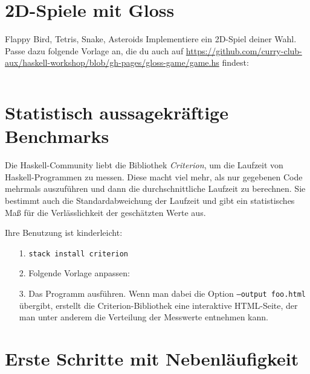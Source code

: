 \documentclass{uebblatt}
\begin{document}
\section{2D-Spiele mit Gloss}

\begin{aufgabe}{Flappy Bird, Tetris, Snake, Asteroids}
  Implementiere ein 2D-Spiel deiner Wahl.
  Passe dazu folgende Vorlage an, die du auch auf \url{https://github.com/curry-club-aux/haskell-workshop/blob/gh-pages/gloss-game/game.hs} findest:

\inputminted[fontsize=\scriptsize]{haskell}{gloss-game/game.hs}
\end{aufgabe}

\section{Statistisch aussagekräftige Benchmarks}

Die Haskell-Community liebt die Bibliothek \emph{Criterion}, um die Laufzeit
von Haskell-Programmen zu messen. Diese macht viel mehr, als nur gegebenen Code
mehrmals auszuführen und dann die durchschnittliche Laufzeit zu berechnen. Sie
bestimmt auch die Standardabweichung der Laufzeit und gibt ein statistisches
Maß für die Verlässlichkeit der geschätzten Werte aus.

Ihre Benutzung ist kinderleicht:

\begin{enumerate}
\item[1.] \texttt{stack install criterion}
\item[2.] Folgende Vorlage anpassen:


\item[3.] Das Programm ausführen. Wenn man dabei die Option \texttt{--output
foo.html} übergibt, erstellt die Criterion-Bibliothek eine interaktive
HTML-Seite, der man unter anderem die Verteilung der Messwerte entnehmen kann.
\end{enumerate}


\section{Erste Schritte mit Nebenläufigkeit}
\end{document}
